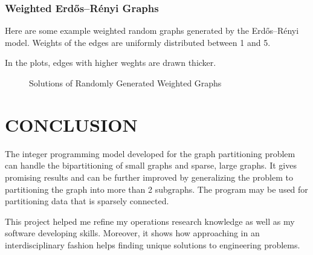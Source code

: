 \documentclass[a4paper,12pt]{report}
\begin{document}
\subsection{Weighted Erdős–Rényi Graphs}

Here are some example weighted random graphs generated by the Erdős–Rényi model. Weights of the edges are uniformly distributed between 1 and 5.

In the plots, edges with higher weghts are drawn thicker.

\begin{figure}[H]
    \centering
    \begin{minipage}{.5\textwidth}
        \centering
	
    \end{minipage}%
    \begin{minipage}{0.5\textwidth}
        \centering
	
    \end{minipage}
\caption{Solutions of Randomly Generated Weighted Graphs}
\end{figure}

\chapter{CONCLUSION}

The integer programming model developed for the graph partitioning problem can handle the bipartitioning of small graphs and sparse, large graphs. It gives promising results and can be further improved by generalizing the problem to partitioning the graph into more than 2 subgraphs. The program may be used for partitioning data that is sparsely connected. 

This project helped me refine my operations research knowledge as well as my software developing skills. Moreover, it shows how approaching in an interdisciplinary fashion helps finding unique solutions to engineering problems.




\appendix	
\end{document}
